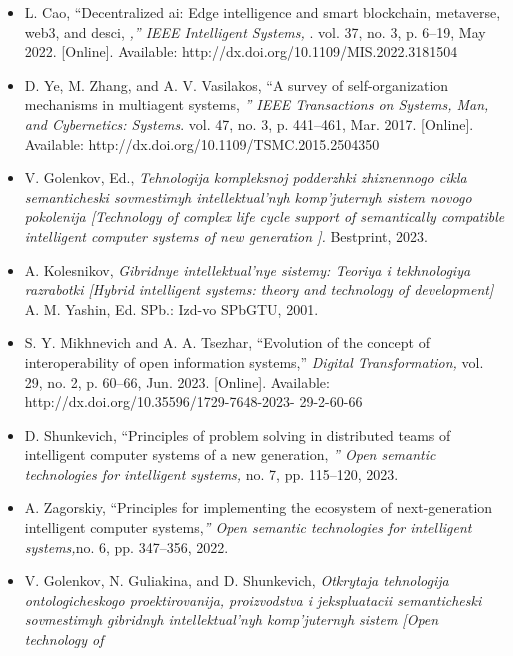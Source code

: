 \documentclass {article}
\begin{document}
\begin{multicols}{2}
\begin{itemize}
  \renewcommand{\labelitemi}{[2]}
  \item L. Cao, “Decentralized ai: Edge intelligence and smart
blockchain, metaverse, web3, and desci,
 \textit{,” IEEE Intelligent Systems, }. vol. 37, no. 3, p. 6–19, May 2022. [Online]. Available:
http://dx.doi.org/10.1109/MIS.2022.3181504
\renewcommand{\labelitemi}{[3]}
		\item D. Ye, M. Zhang, and A. V. Vasilakos, “A survey of
self-organization mechanisms in multiagent systems,  \textit{” IEEE
Transactions on Systems, Man, and Cybernetics: Systems}. vol. 47, no. 3, p. 441–461, Mar. 2017. [Online]. Available:
http://dx.doi.org/10.1109/TSMC.2015.2504350
\renewcommand{\labelitemi}{[4]}	
\item   V. Golenkov, Ed.,\textit{ Tehnologija kompleksnoj podderzhki
zhiznennogo cikla semanticheski sovmestimyh intellektual’nyh
komp’juternyh sistem novogo pokolenija [Technology of complex
life cycle support of semantically compatible intelligent computer
systems of new generation ].} Bestprint, 2023.
\renewcommand{\labelitemi}{[5]}
\item  A. Kolesnikov, \textit{Gibridnye intellektual’nye sistemy: Teoriya i
tekhnologiya razrabotki [Hybrid intelligent systems: theory and
technology of development]} A. M. Yashin, Ed. SPb.: Izd-vo
SPbGTU, 2001.
\renewcommand{\labelitemi}{[6]}
\item S. Y. Mikhnevich and A. A. Tsezhar, “Evolution of the
concept of interoperability of open information systems,”
\textit{Digital Transformation,} vol. 29, no. 2, p. 60–66, Jun. 2023.
[Online]. Available: http://dx.doi.org/10.35596/1729-7648-2023-
29-2-60-66
\renewcommand{\labelitemi}{[7]}
\item  D. Shunkevich, “Principles of problem solving in distributed
teams of intelligent computer systems of a new generation, \textit{” Open
semantic technologies for intelligent systems, } no. 7, pp. 115–120,
2023.
\renewcommand{\labelitemi}{[8]}
\item A. Zagorskiy, “Principles for implementing the ecosystem of
next-generation intelligent computer systems,\textit{” Open semantic
technologies for intelligent systems,}no. 6, pp. 347–356, 2022.
\renewcommand{\labelitemi}{[9]}
\item  V. Golenkov, N. Guliakina, and D. Shunkevich, \textit{Otkrytaja
tehnologija ontologicheskogo proektirovanija, proizvodstva
i jekspluatacii semanticheski sovmestimyh gibridnyh
intellektual’nyh komp’juternyh sistem [Open technology of
}
\end{itemize}
\end{multicols}
\end{document}
